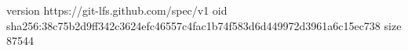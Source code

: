 version https://git-lfs.github.com/spec/v1
oid sha256:38c75b2d9ff342c3624efc46557c4fac1b74f583d6d449972d3961a6c15ec738
size 87544
